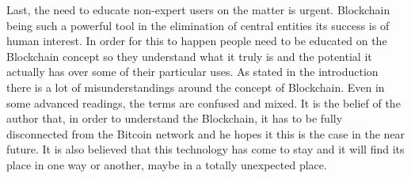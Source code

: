 \documentclass[..]{subfiles}
\begin{document}
Last, the need to educate non-expert users on the matter is urgent. Blockchain being such a powerful tool in the elimination of central entities its success is of human interest. In order for this to happen people need to be educated on the Blockchain concept so they understand what it truly is and the potential it actually has over some of their particular uses. As stated in the introduction there is a lot of misunderstandings around the concept of Blockchain. Even in some advanced readings, the terms are confused and mixed. It is the belief of the author that, in order to understand the Blockchain, it has to be fully disconnected from the Bitcoin network and he hopes it this is the case in the near future. It is also believed that this technology has come to stay and it will find its place in one way or another, maybe in a totally unexpected place.
\end{document}
